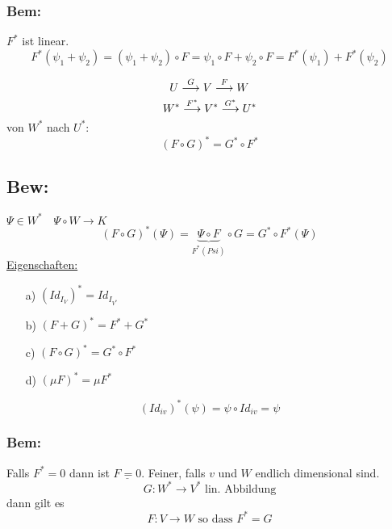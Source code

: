 \documentclass[titlepage,12pt,a4paper,ngerman]{report}
\newcommand{\tx}[1]{\textrm{#1}}
\newcommand{\ub}[1]{\underbrace{#1}}
\begin{document}
\subsubsection*{Bem:}
$F^*$ ist linear. 
$$F^* (\psi_1 + \psi_2) = (\psi_1 + \psi_2) \circ F = \psi_1 \circ F + \psi_2 \circ F = F^* (\psi_1) + F^* (\psi_2)$$

$$ U \buildrel G \over \longrightarrow V \buildrel F \over \longrightarrow W$$
$$ W^* \buildrel F^* \over \longrightarrow V^* \buildrel G^* \over \longrightarrow U^*$$
von $ W^* $ nach $ U^* $:
$$(F\circ G)^* = G^* \circ F^*$$
\subsection{Bew:} $ \Psi \in W^* \quad \Psi \circ W \to K $ 
$$(F \circ G)^*(\Psi) = \ub{\Psi\circ F}_{F^*(Psi)} \circ G = G^* \circ F^*(\Psi)$$
\underline{Eigenschaften:}
\begin{itemize}
	\item[a)] $ (Id_{I_{V}})^* = Id_{I_{V^*}} $
	\item[b)] $ (F+G)^* = F^* + G^* $
	\item[c)] $ (F\circ G)^* = G^* \circ F^* $
	\item[d)] $ (\mu F)^* = \mu F^* $
\end{itemize}

$$(Id_{iv})^* (\psi) = \psi \circ Id_{iv} = \psi$$
\subsubsection*{Bem:} Falls $F^* =0$ dann ist $\underline{F = 0}$. Feiner, falls $v$ und $W$ endlich dimensional sind.
$$G: W^* \to V^* \tx{ lin. Abbildung}$$ dann gilt es $$F: V \to W \tx{ so dass } F^* = G$$
\end{document}
